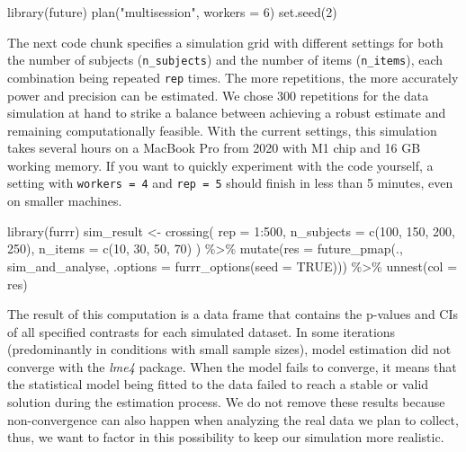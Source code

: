 \documentclass[
  man,
  floatsintext,
  longtable,
  a4paper,
  nolmodern,
  notxfonts,
  notimes,
  colorlinks=true,linkcolor=blue,citecolor=blue,urlcolor=blue]{apa7}
\newenvironment{Shaded}{\begin{snugshade}}{\end{snugshade}}
\newcommand{\AttributeTok}[1]{\textcolor[rgb]{0.40,0.45,0.13}{#1}}
\newcommand{\ConstantTok}[1]{\textcolor[rgb]{0.56,0.35,0.01}{#1}}
\newcommand{\DecValTok}[1]{\textcolor[rgb]{0.68,0.00,0.00}{#1}}
\newcommand{\FunctionTok}[1]{\textcolor[rgb]{0.28,0.35,0.67}{#1}}
\newcommand{\NormalTok}[1]{\textcolor[rgb]{0.00,0.23,0.31}{#1}}
\newcommand{\OtherTok}[1]{\textcolor[rgb]{0.00,0.23,0.31}{#1}}
\newcommand{\SpecialCharTok}[1]{\textcolor[rgb]{0.37,0.37,0.37}{#1}}
\newcommand{\StringTok}[1]{\textcolor[rgb]{0.13,0.47,0.30}{#1}}
\begin{document}
\begin{Shaded}
\begin{Highlighting}[]
\FunctionTok{library}\NormalTok{(future)}
\FunctionTok{plan}\NormalTok{(}\StringTok{"multisession"}\NormalTok{, }\AttributeTok{workers =} \DecValTok{6}\NormalTok{)}
\FunctionTok{set.seed}\NormalTok{(}\DecValTok{2}\NormalTok{)}
\end{Highlighting}
\end{Shaded}

The next code chunk specifies a simulation grid with different settings
for both the number of subjects (\texttt{n\_subjects}) and the number of
items (\texttt{n\_items}), each combination being repeated \texttt{rep}
times. The more repetitions, the more accurately power and precision can
be estimated. We chose 300 repetitions for the data simulation at hand
to strike a balance between achieving a robust estimate and remaining
computationally feasible. With the current settings, this simulation
takes several hours on a MacBook Pro from 2020 with M1 chip and 16 GB
working memory. If you want to quickly experiment with the code
yourself, a setting with \texttt{workers\ =\ 4} and \texttt{rep\ =\ 5}
should finish in less than 5 minutes, even on smaller machines.

\begin{Shaded}
\begin{Highlighting}[]
\FunctionTok{library}\NormalTok{(furrr)}
\NormalTok{sim\_result }\OtherTok{\textless{}{-}} \FunctionTok{crossing}\NormalTok{(}
  \AttributeTok{rep =} \DecValTok{1}\SpecialCharTok{:}\DecValTok{500}\NormalTok{,}
  \AttributeTok{n\_subjects =} \FunctionTok{c}\NormalTok{(}\DecValTok{100}\NormalTok{, }\DecValTok{150}\NormalTok{, }\DecValTok{200}\NormalTok{, }\DecValTok{250}\NormalTok{),}
  \AttributeTok{n\_items =} \FunctionTok{c}\NormalTok{(}\DecValTok{10}\NormalTok{, }\DecValTok{30}\NormalTok{, }\DecValTok{50}\NormalTok{, }\DecValTok{70}\NormalTok{)}
\NormalTok{) }\SpecialCharTok{\%\textgreater{}\%}
  \FunctionTok{mutate}\NormalTok{(}\AttributeTok{res =} \FunctionTok{future\_pmap}\NormalTok{(., sim\_and\_analyse, }
    \AttributeTok{.options =} \FunctionTok{furrr\_options}\NormalTok{(}\AttributeTok{seed =} \ConstantTok{TRUE}\NormalTok{))) }\SpecialCharTok{\%\textgreater{}\%}
  \FunctionTok{unnest}\NormalTok{(}\AttributeTok{col =}\NormalTok{ res)}
\end{Highlighting}
\end{Shaded}

The result of this computation is a data frame that contains the
p-values and CIs of all specified contrasts for each simulated dataset.
In some iterations (predominantly in conditions with small sample
sizes), model estimation did not converge with the \emph{lme4} package.
When the model fails to converge, it means that the statistical model
being fitted to the data failed to reach a stable or valid solution
during the estimation process. We do not remove these results because
non-convergence can also happen when analyzing the real data we plan to
collect, thus, we want to factor in this possibility to keep our
simulation more realistic.
\end{document}
